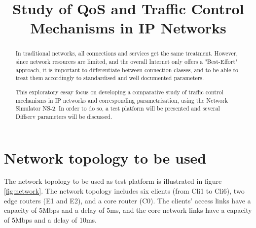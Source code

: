 \documentclass[conference,compsoc]{IEEEtran}
\begin{document}
    \title{Study of QoS and Traffic Control Mechanisms in IP Networks}
    
    \author{
    }
    
    \maketitle
    
    \begin{abstract}
    In traditional networks, all connections and services get the same treatment. However, since network resources are limited, and the overall Internet only offers a "Best-Effort" approach, it is important to differentiate between connection classes, and to be able to treat them accordingly to standardised and well documented parameters. \par 
    This exploratory essay focus on developing a comparative study of traffic control mechanisms in IP networks and corresponding parametrisation,
    using the Network Simulator NS-2. In order to do so, a test platform will be presented and several Diffserv parameters will be discussed.
    \end{abstract}
    
    \IEEEpeerreviewmaketitle
    
    \section{Network topology to be used}
    
    The network topology to be used as test platform is illustrated in figure \ref{fig:network}. The network topology includes six clients (from Cli1 to Cli6), two edge routers (E1 and E2), and a core router (C0). The clients' access links have a capacity of 5Mbps and a delay of 5ms, and the core network links have a capacity of 5Mbps and a delay of 10ms.\par 
    
\end{document}
